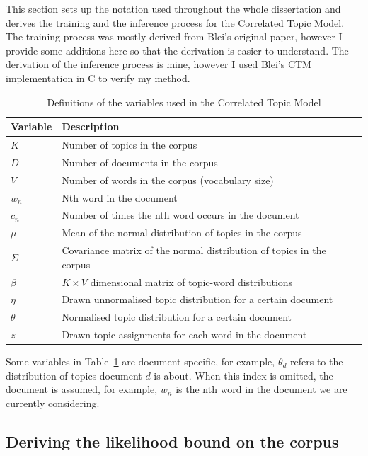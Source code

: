\documentclass[12pt,a4paper,twoside,openright]{report}
\begin{document}
This section sets up the notation used throughout the whole dissertation and derives the training and the inference process for the Correlated Topic Model. The training process was mostly derived from Blei's original paper, however I provide some additions here so that the derivation is easier to understand. The derivation of the inference process is mine, however I used Blei's CTM implementation in C to verify my method.

\begin{table}
\begin{tabular}{| l | l |}
\hline
Variable & Description \\
\hline
$K$ & Number of topics in the corpus \\
$D$ & Number of documents in the corpus \\
$V$ & Number of words in the corpus (vocabulary size) \\
$w_n$ & Nth word in the document \\
$c_n$ & Number of times the nth word occurs in the document \\
$\mu$ & Mean of the normal distribution of topics in the corpus \\
$\Sigma$ & Covariance matrix of the normal distribution of topics in the corpus \\
$\beta$ & $K \times V$ dimensional matrix of topic-word distributions \\
$\eta$ & Drawn unnormalised topic distribution for a certain document \\
$\theta$ & Normalised topic distribution for a certain document \\
$z$ & Drawn topic assignments for each word in the document \\
\hline
\end{tabular}
\caption{Definitions of the variables used in the Correlated Topic Model}
\label{tab:ctm-variables}
\end{table}

Some variables in Table~\ref{tab:ctm-variables} are document-specific, for example, $\theta_d$ refers to the distribution of topics document $d$ is about. When this index is omitted, the document is assumed, for example, $w_n$ is the nth word in the document we are currently considering.

\subsection{Deriving the likelihood bound on the corpus}
\end{document}
